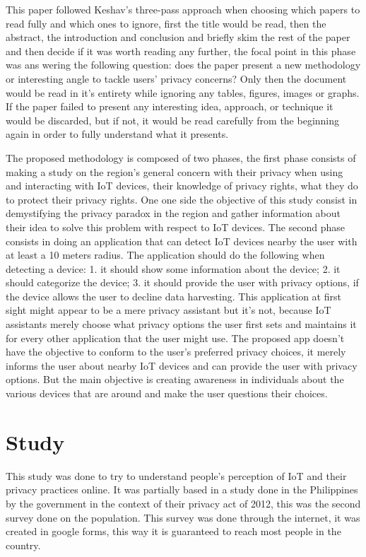 \documentclass[conference]{IEEEtran}
\begin{document}
This paper followed Keshav's three-pass approach \cite{KeshavHow} when choosing which
papers to read fully and which ones to ignore, first the title would be read,
then the abstract, the introduction and conclusion and briefly skim the rest of the paper
and then decide if it was worth reading any further, the focal point in this
phase was ans wering the following question: does the paper present a new
methodology or interesting angle to tackle users' privacy concerns? Only then
the document would be read in it's entirety while ignoring any tables, figures,
images or graphs. If the paper failed to present any interesting idea, approach,
or technique it would be discarded, but if not, it would be read carefully
from the beginning again in order to fully understand what it presents.

The proposed methodology is composed of two phases, the first phase consists
of making a study on the region's general concern with their privacy when using
and interacting with IoT devices, their knowledge of privacy rights, what they
do to protect their privacy rights. One one side the objective of this study
consist in demystifying the privacy paradox in the region and gather information
about their idea to solve this problem with respect to IoT devices. The second
phase consists in doing an application that can detect IoT devices nearby the
user with at least a 10 meters radius. The application should do the following
when detecting a device:
1. it should show some information about the device;
2. it should categorize the device;
3. it should provide the user with privacy options, if the device allows the
user to decline data harvesting.
This application at first sight might appear to be a mere privacy assistant but
it's not, because IoT assistants merely choose what privacy options the user
first sets and maintains it for every other application that the user might use.
The proposed app doesn't have the objective to conform to the user's preferred
privacy choices, it merely informs the user about nearby IoT devices and can
provide the user with privacy options. But the main objective is creating
awareness in individuals about the various devices that are around and make the
user questions their choices.

\section{Study}

This study was done to try to understand people's perception of IoT and their
privacy practices online. It was partially based in a study done in the Philippines
by the government in the context of their privacy act of 2012, this was the second
survey done on the population. This survey was done through the internet, it
was created in google forms, this way it is guaranteed to reach most people in
the country.
\end{document}
